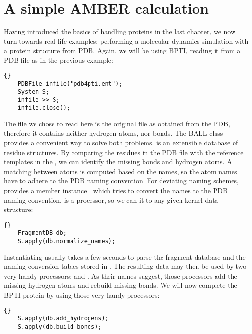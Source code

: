 \section{A simple AMBER calculation}


Having introduced the basics of handling proteins in the last chapter, we now
turn towards real-life examples: performing a molecular dynamics simulation
with a protein structure from PDB. Again, we will be using BPTI, reading it
from a PDB file as in the previous example:

\begin{lstlisting}{}
	PDBFile	infile("pdb4pti.ent");
	System S;
	infile >> S;
	infile.close();
\end{lstlisting}

\noindent
The file we chose to read here is the original file as obtained from
the PDB, therefore it contains neither hydrogen atoms, nor bonds.
The BALL class  provides a convenient way to solve
both problems.  is an extensible database of residue
structures. By comparing the residues in the PDB file with the reference
templates in the , we can identify the missing bonds
and hydrogen atoms. A matching between atoms is computed based on the names,
so the atom names have to adhere to the PDB naming convention.
For deviating naming schemes,  provides a member instance
, which tries to convert the names to the PDB 
naming convention.  is a processor, so we
can  it to any given kernel data structure:

\begin{lstlisting}{}
	FragmentDB db;
	S.apply(db.normalize_names);
\end{lstlisting}

\noindent
Instantiating  usually takes a few seconds to parse the
fragment database and the naming conversion tables stored in
. The resulting data may then be used by two
very handy processors:  and .
As their names suggest, those processors add the missing hydrogen atoms and
rebuild missing bonds. We will now complete the BPTI protein by using those
very handy processors:

\begin{lstlisting}{}
	S.apply(db.add_hydrogens);
	S.apply(db.build_bonds);
\end{lstlisting}

